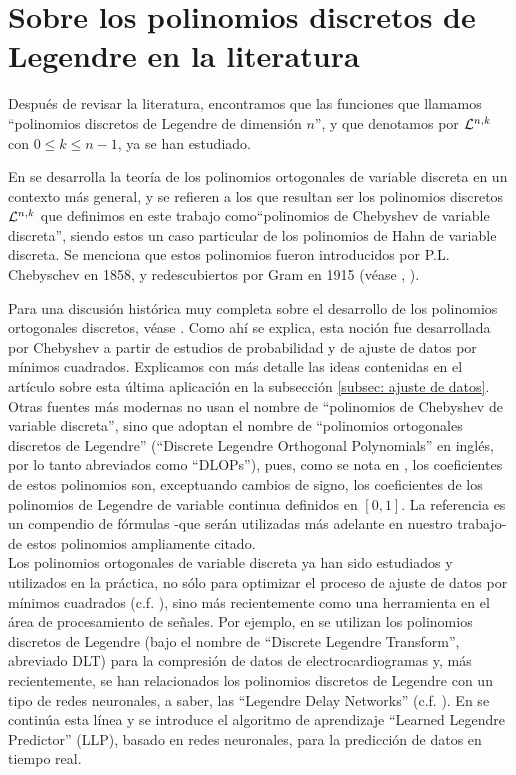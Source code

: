 \section{Sobre los polinomios discretos de Legendre en la literatura}
\label{sec: Sobre los polinomios discretos de Legendre en la literatura}

Después de revisar la literatura, encontramos que
las funciones que llamamos ``polinomios discretos de Legendre
de dimensión $n$'', y que denotamos
por $\mathcal{L}^{n,k}$ con $0 \leq k \leq n-1$, ya se han estudiado.

En \cite{nikiforov} se desarrolla la teoría 
de los polinomios ortogonales de variable discreta
en un contexto
más general, y se refieren a los que resultan ser
los polinomios discretos $\mathcal{L}^{n,k}$ que definimos
en este trabajo
como``polinomios de Chebyshev de variable discreta'', 
siendo estos un caso particular
de los polinomios de Hahn 
de variable discreta.
Se menciona que estos polinomios
fueron introducidos
por P.L. Chebyschev en 1858,
y redescubiertos por
Gram en 1915
(véase \cite{tcheb}, \cite{Neuman}).

Para una discusión histórica muy completa
sobre el desarrollo de los polinomios
ortogonales discretos,
véase \cite{roy}. Como ahí se explica, esta
noción fue desarrollada por Chebyshev a partir
de estudios de probabilidad y de ajuste de datos
por mínimos cuadrados. Explicamos con más detalle las ideas
contenidas en el artículo \cite{george}
sobre esta última aplicación en
la subsección \eqref{subsec: ajuste de datos}. \\

Otras fuentes más modernas no usan el nombre de 
``polinomios de Chebyshev de variable discreta'', sino que
adoptan el nombre de ``polinomios ortogonales discretos de Legendre''
(``Discrete Legendre
Orthogonal Polynomials'' en inglés, por lo tanto abreviados
como ``DLOPs''), pues, como se nota en 
\cite{Neuman}, los coeficientes de estos polinomios son,
exceptuando cambios de signo, 
los coeficientes de los polinomios de Legendre de variable
continua definidos en $[0,1]$.
La referencia \cite{Neuman} es un compendio de fórmulas
-que serán utilizadas más adelante en nuestro trabajo-
de estos polinomios ampliamente citado. \\


Los polinomios ortogonales de variable discreta
ya han sido estudiados y utilizados en la práctica,
no sólo para optimizar el proceso de ajuste de
datos por mínimos cuadrados 
(c.f. \cite{george}), sino más recientemente como 
una herramienta en el área de procesamiento de señales.
Por ejemplo, en 
\cite{colomer}
se utilizan los polinomios
discretos de Legendre
(bajo el nombre de
``Discrete Legendre Transform'', abreviado DLT) 
para la compresión de datos de electrocardiogramas
y, más recientemente, se han
relacionados los polinomios discretos de Legendre 
con un tipo de redes neuronales, a
saber, las ``Legendre Delay Networks''
(c.f. \cite{stockel}).
En \cite{furlong} se continúa esta línea y 
se introduce el algoritmo de aprendizaje ``Learned Legendre Predictor'' (LLP),
basado en redes neuronales, para la predicción de datos en tiempo real. \\

